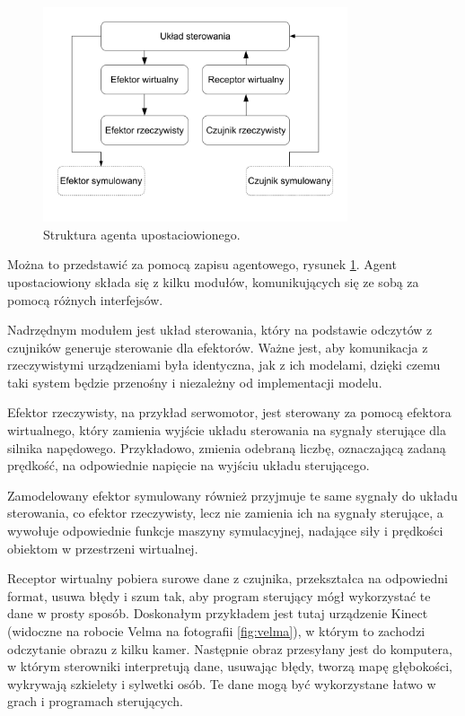 	\begin{figure}[H]
	\centering
	\includegraphics[width=0.8\textwidth]{graphics/agent.pdf}
	\caption{Struktura agenta upostaciowionego.}
	\label{fig:agent}
	\end{figure} 

	Można to przedstawić za pomocą zapisu agentowego, rysunek \ref{fig:agent}.
	Agent upostaciowiony składa się z kilku modułów, komunikujących się ze sobą za pomocą różnych interfejsów.

	Nadrzędnym modułem jest układ sterowania, który na podstawie odczytów z czujników generuje sterowanie dla efektorów.
	Ważne jest, aby komunikacja z rzeczywistymi urządzeniami była identyczna, jak z ich modelami, dzięki czemu taki system będzie przenośny i niezależny od implementacji modelu.

	Efektor rzeczywisty, na przykład serwomotor, jest sterowany za pomocą efektora wirtualnego, który zamienia wyjście układu sterowania na sygnały sterujące dla silnika napędowego.
	Przykładowo, zmienia odebraną liczbę, oznaczającą zadaną prędkość, na odpowiednie napięcie na wyjściu układu sterującego.

	Zamodelowany efektor symulowany również przyjmuje te same sygnały do układu sterowania, co efektor rzeczywisty, 
	lecz nie zamienia ich na sygnały sterujące, a wywołuje odpowiednie funkcje maszyny symulacyjnej, nadające siły i prędkości obiektom w przestrzeni wirtualnej.

	Receptor wirtualny pobiera surowe dane z czujnika, przekształca na odpowiedni format, usuwa błędy i szum tak, aby program sterujący mógł wykorzystać te dane w prosty sposób. 
	Doskonałym przykładem jest tutaj urządzenie Kinect (widoczne na robocie Velma na fotografii \ref{fig:velma}), w którym to zachodzi odczytanie obrazu z kilku kamer.
	Następnie obraz przesyłany jest do komputera, w którym sterowniki interpretują dane, usuwając błędy, tworzą mapę głębokości, wykrywają szkielety i sylwetki osób.
	Te dane mogą być wykorzystane łatwo w grach i programach sterujących.

